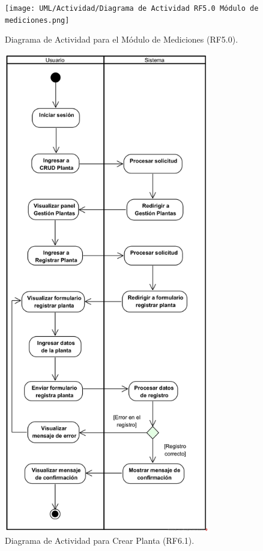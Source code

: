 \begin{figure}[H]
	\centering
	\caption{Diagrama de Actividad para el Módulo de Mediciones (RF5.0).}
 \texttt{[image: UML/Actividad/Diagrama de Actividad RF5.0 Módulo de mediciones.png]}
\end{figure}


\begin{figure}[H]
	\centering
	\caption{Diagrama de Actividad para Crear Planta (RF6.1).}
 \includegraphics[width=0.8\textwidth]{UML/Actividad/Diagrama de Actividad RF6.1 Crear Planta.png}
\end{figure}



